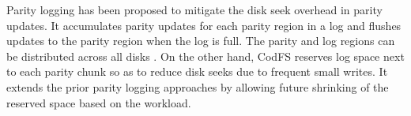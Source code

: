 Parity logging \cite{chen94,stodolsky93} has been proposed to mitigate the disk
seek overhead in parity updates.  It accumulates parity updates for each
parity region in a log and flushes updates to the parity region when the log
is full.  The parity and log regions can be distributed across all disks
\cite{stodolsky93}.  On the other hand, CodFS reserves log space next to each
parity chunk so as to reduce disk seeks due to frequent small writes.  It
extends the prior parity logging approaches by allowing future shrinking of
the reserved space based on the workload. 



%
